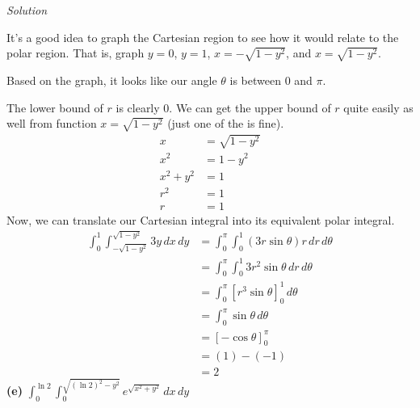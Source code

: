 \documentclass{article}
\newcommand{\lrb}[1]{\left[ #1 \right]}
\newcommand{\Solution}{\textit{Solution}}
\begin{document}
\Solution

It's a good idea to graph the Cartesian region to see how it would relate to the polar region. That is, graph $y=0$, $y=1$, $x=-\sqrt{1-y^2}$, and $x=\sqrt{1-y^2}$.
\begin{center}
\end{center}
Based on the graph, it looks like our angle $\theta$ is between $0$ and $\pi$.

The lower bound of $r$ is clearly $0$. We can get the upper bound of $r$ quite easily as well from function $x=\sqrt{1-y^2}$ (just one of the is fine).
\begin{align*}
    x&=\sqrt{1-y^2}\\
    x^2&=1-y^2\\
    x^2+y^2&=1\\
    r^2&=1\tag{in polar, $x^2+y^2=r^2$}\\
    r&=1\tag{keep positive $r$}
\end{align*}
Now, we can translate our Cartesian integral into its equivalent polar integral.
\begin{align*}
\int_0^{1}\int_{-\sqrt{1-y^2}}^{\sqrt{1-y^2}}3y\,dx\,dy&=\int_0^\pi\int_0^1 (3r\sin\theta)r\,dr\,d\theta\tag{in polar, $y=r\sin\theta$}\\
&=\int_0^\pi \int_0^1 3r^2\sin\theta\,dr\,d\theta\\
&=\int_0^\pi \lrb{r^3\sin\theta}_0^1\,d\theta\\
&=\int_0^\pi \sin\theta \,d\theta\\
&=\lrb{-\cos\theta}_0^\pi\\
&=(1)-(-1)\\
&=\boxed{2}
\end{align*}
\textbf{(e)} $\displaystyle \int_0^{\ln 2}\int_0^{\sqrt{(\ln 2)^2-y^2}}e^{\sqrt{x^2+y^2}}\,dx\,dy$
\end{document}
